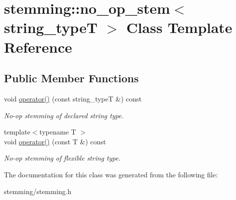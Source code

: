 \hypertarget{classstemming_1_1no__op__stem}{\section{stemming\-:\-:no\-\_\-op\-\_\-stem$<$ string\-\_\-type\-T $>$ Class Template Reference}
\label{classstemming_1_1no__op__stem}
}
\subsection*{Public Member Functions}
\begin{DoxyCompactItemize}
\item 
\hypertarget{group___stemming_ga5e95ea3afb739e7bea6b14a3e9150c89}{void \hyperlink{group___stemming_ga5e95ea3afb739e7bea6b14a3e9150c89}{operator()} (const string\-\_\-type\-T \&) const }\label{group___stemming_ga5e95ea3afb739e7bea6b14a3e9150c89}

\begin{DoxyCompactList}\small\item\em No-\/op stemming of declared string type. \end{DoxyCompactList}\item 
\hypertarget{group___stemming_ga8109dda5e97b7c138f9aa9ec9ea4ee9f}{{\footnotesize template$<$typename T $>$ }\\void \hyperlink{group___stemming_ga8109dda5e97b7c138f9aa9ec9ea4ee9f}{operator()} (const T \&) const }\label{group___stemming_ga8109dda5e97b7c138f9aa9ec9ea4ee9f}

\begin{DoxyCompactList}\small\item\em No-\/op stemming of flexible string type. \end{DoxyCompactList}\end{DoxyCompactItemize}


The documentation for this class was generated from the following file\-:\begin{DoxyCompactItemize}
\item 
stemming/stemming.\-h\end{DoxyCompactItemize}
